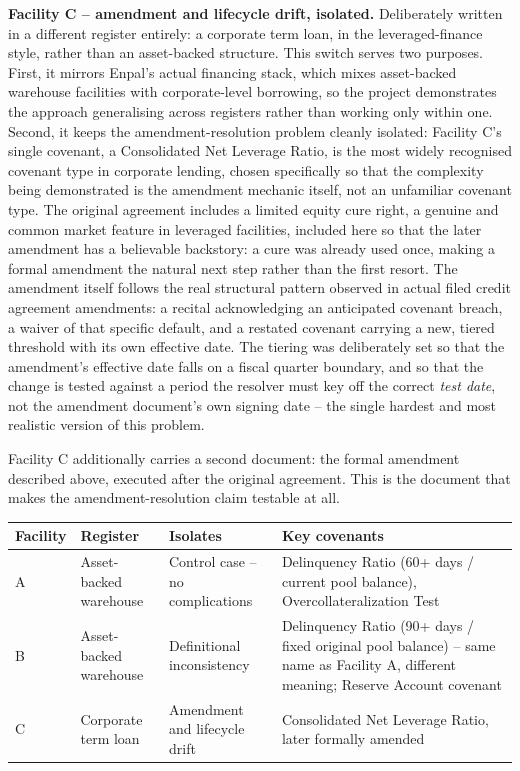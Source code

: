 \documentclass[11pt,a4paper]{article}
\begin{document}
\textbf{Facility C -- amendment and lifecycle drift, isolated.} Deliberately written in a different register entirely: a corporate term loan, in the leveraged-finance style, rather than an asset-backed structure. This switch serves two purposes. First, it mirrors Enpal's actual financing stack, which mixes asset-backed warehouse facilities with corporate-level borrowing, so the project demonstrates the approach generalising across registers rather than working only within one. Second, it keeps the amendment-resolution problem cleanly isolated: Facility C's single covenant, a Consolidated Net Leverage Ratio, is the most widely recognised covenant type in corporate lending, chosen specifically so that the complexity being demonstrated is the amendment mechanic itself, not an unfamiliar covenant type. The original agreement includes a limited equity cure right, a genuine and common market feature in leveraged facilities, included here so that the later amendment has a believable backstory: a cure was already used once, making a formal amendment the natural next step rather than the first resort. The amendment itself follows the real structural pattern observed in actual filed credit agreement amendments: a recital acknowledging an anticipated covenant breach, a waiver of that specific default, and a restated covenant carrying a new, tiered threshold with its own effective date. The tiering was deliberately set so that the amendment's effective date falls on a fiscal quarter boundary, and so that the change is tested against a period the resolver must key off the correct \emph{test date}, not the amendment document's own signing date -- the single hardest and most realistic version of this problem.

Facility C additionally carries a second document: the formal amendment described above, executed after the original agreement. This is the document that makes the amendment-resolution claim testable at all.

\begin{center}
\renewcommand{\arraystretch}{1.35}
\begin{tabular}{@{}p{2.1cm}p{2.6cm}p{4.3cm}p{5.4cm}@{}}
\toprule
\textbf{Facility} & \textbf{Register} & \textbf{Isolates} & \textbf{Key covenants} \\
\midrule
A & Asset-backed warehouse & Control case -- no complications & Delinquency Ratio (60+ days / current pool balance), Overcollateralization Test \\
B & Asset-backed warehouse & Definitional inconsistency & Delinquency Ratio (90+ days / fixed original pool balance) -- same name as Facility A, different meaning; Reserve Account covenant \\
C & Corporate term loan & Amendment and lifecycle drift & Consolidated Net Leverage Ratio, later formally amended \\
\bottomrule
\end{tabular}
\end{center}
\end{document}
